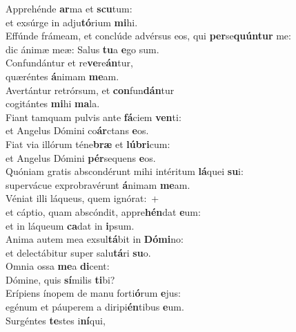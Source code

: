 \evenverse Apprehénde \textbf{ar}ma et \textbf{scu}tum:~\*\\
\evenverse et exsúrge in adju\textbf{tó}rium \textbf{mi}hi.\\
\oddverse Effúnde frámeam, et conclúde advérsus eos, qui \textbf{per}se\textbf{quún}\textbf{tur} me:~\*\\
\oddverse dic ánimæ meæ: Salus \textbf{tu}a \textbf{e}go sum.\\
\evenverse Confundántur et re\textbf{ve}re\textbf{án}tur,~\*\\
\evenverse quæréntes \textbf{á}nimam \textbf{me}am.\\
\oddverse Avertántur retrórsum, et \textbf{con}fun\textbf{dán}tur~\*\\
\oddverse cogitántes \textbf{mi}hi \textbf{ma}la.\\
\evenverse Fiant tamquam pulvis ante \textbf{fá}ciem \textbf{ven}ti:~\*\\
\evenverse et Angelus Dómini co\textbf{ár}ctans \textbf{e}os.\\
\oddverse Fiat via illórum téne\textbf{bræ} et \textbf{lú}\textbf{bri}cum:~\*\\
\oddverse et Angelus Dómini \textbf{pér}sequens \textbf{e}os.\\
\evenverse Quóniam gratis abscondérunt mihi intéritum \textbf{lá}quei \textbf{su}i:~\*\\
\evenverse supervácue exprobravérunt \textbf{á}nimam \textbf{me}am.\\
\oddverse Véniat illi láqueus, quem ignórat:~+\\
\oddverse  et cáptio, quam abscóndit, appre\textbf{hén}dat \textbf{e}um:~\*\\
\oddverse et in láqueum \textbf{ca}dat in \textbf{i}psum.\\
\evenverse Anima autem mea exsul\textbf{tá}bit in \textbf{Dó}\textbf{mi}no:~\*\\
\evenverse et delectábitur super salu\textbf{tá}ri \textbf{su}o.\\
\oddverse Omnia ossa \textbf{me}a \textbf{di}cent:~\*\\
\oddverse Dómine, quis \textbf{sí}milis \textbf{ti}bi?\\
\evenverse Erípiens ínopem de manu forti\textbf{ó}rum \textbf{e}jus:~\*\\
\evenverse egénum et páuperem a diripi\textbf{én}tibus \textbf{e}um.\\
\oddverse Surgéntes \textbf{te}stes i\textbf{ní}qui,~\*\\

